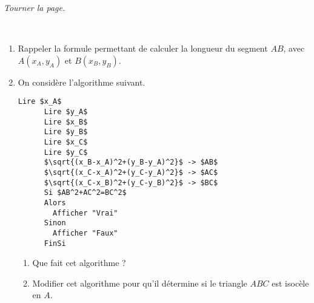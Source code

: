 \documentclass[11pt]{article}
\begin{document}
\vfill\hfill
\emph{Tourner la page.}
\newpage

\begin{exercice}~
  \begin{enumerate}
    \item Rappeler la formule permettant de calculer la longueur du segment $AB$, avec $A(x_A,y_A)$ et $B(x_B,y_B)$.
    \item On considère l'algorithme suivant.
      \begin{lstlisting}[language=naturel,frame=lines,mathescape=true]
      Lire $x_A$
      Lire $y_A$
      Lire $x_B$
      Lire $y_B$
      Lire $x_C$
      Lire $y_C$
      $\sqrt{(x_B-x_A)^2+(y_B-y_A)^2}$ -> $AB$
      $\sqrt{(x_C-x_A)^2+(y_C-y_A)^2}$ -> $AC$
      $\sqrt{(x_C-x_B)^2+(y_C-y_B)^2}$ -> $BC$
      Si $AB^2+AC^2=BC^2$
      Alors
        Afficher "Vrai"
      Sinon
        Afficher "Faux"
      FinSi
      \end{lstlisting}
      \begin{enumerate}
        \item Que fait cet algorithme ?
        \item Modifier cet algorithme pour qu'il détermine si le triangle $ABC$ est isocèle en $A$.
      \end{enumerate}
  \end{enumerate}

\end{exercice}
\end{document}
